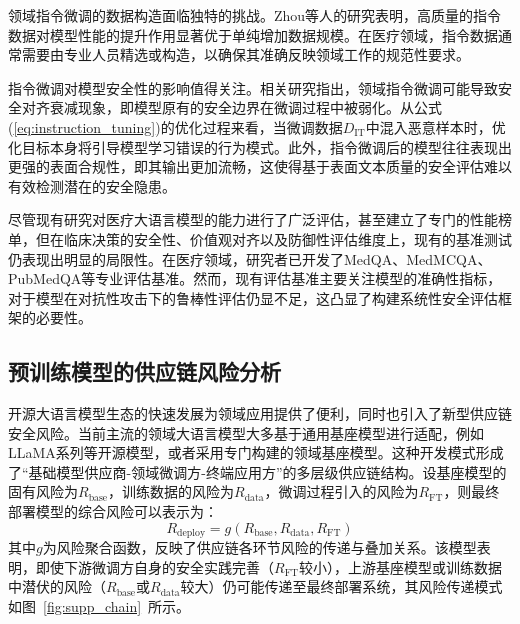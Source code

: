 领域指令微调的数据构造面临独特的挑战。Zhou等人\cite{zhou2023lima}的研究表明，高质量的指令数据对模型性能的提升作用显著优于单纯增加数据规模。在医疗领域，指令数据通常需要由专业人员精选或构造\cite{singhal2023large,liu2024benchhealth}，以确保其准确反映领域工作的规范性要求。

指令微调对模型安全性的影响值得关注。相关研究指出，领域指令微调可能导致安全对齐衰减现象\cite{qi2024finetuning}，即模型原有的安全边界在微调过程中被弱化。从公式(\ref{eq:instruction_tuning})的优化过程来看，当微调数据$D_{\text{IT}}$中混入恶意样本时，优化目标本身将引导模型学习错误的行为模式。此外，指令微调后的模型往往表现出更强的表面合规性，即其输出更加流畅，这使得基于表面文本质量的安全评估难以有效检测潜在的安全隐患。

尽管现有研究对医疗大语言模型的能力进行了广泛评估\cite{thirunavukarasu2023large, li2024comprehensive}，甚至建立了专门的性能榜单\cite{ura2024open}，但在临床决策的安全性、价值观对齐以及防御性评估维度上，现有的基准测试仍表现出明显的局限性。在医疗领域，研究者已开发了MedQA\cite{jin2021medqa}、MedMCQA\cite{pal2022medmcqa}、PubMedQA\cite{jin2019pubmedqa}等专业评估基准\cite{hendrycks2020mmlu,huang2023ceval,singhal2025nature}。然而，现有评估基准主要关注模型的准确性指标，对于模型在对抗性攻击下的鲁棒性评估仍显不足，这凸显了构建系统性安全评估框架的必要性。

\subsection{预训练模型的供应链风险分析}
\label{subsec:supply_chain}

开源大语言模型生态的快速发展为领域应用提供了便利，同时也引入了新型供应链安全风险。当前主流的领域大语言模型大多基于通用基座模型进行适配，例如LLaMA系列\cite{touvron2023llama,touvron2023llama2}等开源模型，或者采用专门构建的领域基座模型\cite{luo2022biogpt,huang2019clinicalbert,zhang2023huatuogpt}。这种开发模式形成了“基础模型供应商-领域微调方-终端应用方”的多层级供应链结构。设基座模型的固有风险为$R_{\text{base}}$，训练数据的风险为$R_{\text{data}}$，微调过程引入的风险为$R_{\text{FT}}$，则最终部署模型的综合风险可以表示为：
\begin{equation}
 R_{\text{deploy}} = g(R_{\text{base}}, R_{\text{data}}, R_{\text{FT}})
\label{eq:supply_chain_risk}
\end{equation}
其中$g$为风险聚合函数，反映了供应链各环节风险的传递与叠加关系。该模型表明，即使下游微调方自身的安全实践完善（$R_{\text{FT}}$较小），上游基座模型或训练数据中潜伏的风险（$R_{\text{base}}$或$R_{\text{data}}$较大）仍可能传递至最终部署系统，其风险传递模式如图~\ref{fig:supp_chain}~所示。

